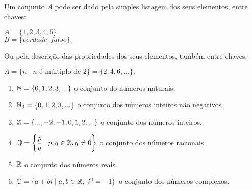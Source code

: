 \documentclass{beamer}
\begin{document}
    \begin{frame}
        Um conjunto $A$ pode ser dado pela simples listagem dos seus elementos, entre chaves:\pause
            \begin{center}
                $A = \{1,2,3,4,5\}$\pause\\
                $B = \{verdade, falso\}.$\pause
            \end{center}
            

        Ou pela descri{\c c}{\~a}o das propriedades dos seus elementos, tamb\'em  entre chaves:\pause
        \begin{center}
            $A = \{n \mid n \mbox{ \'e m{\'u}ltiplo de } 2\} = \{2,4,6,...\}.$
        \end{center}

        \begin{enumerate}[label={\arabic*})]
            \item $\mathbb{N} = \{0,1,2,3,...\}$ o conjunto do n{\'u}meros naturais.\pause
            \item $\mathbb{N}_0 = \{0,1,2,3,...\}$ o conjunto dos n{\'u}meros inteiros n{\~a}o negativos.\pause
            \item $\mathbb{Z} = \{...,-2,-1,0,1,2,...\}$ o conjunto dos n{\'u}meros inteiros.\pause
            \item $\mathbb{Q} = \left\{\dfrac{p}{q} \mid p,q \in \mathbb{Z}, q \neq 0 \right\}$ o conjunto dos n{\'u}meros racionais.\pause
            \item $\mathbb{R} $ o conjunto dos n{\'u}meros reais.\pause
            \item $\mathbb{C} = \{a + bi \mid a,b \in \mathbb{R},\ i^2 = -1\}$ o conjunto dos n\'umeros complexos.
        \end{enumerate}
    \end{frame}
\end{document}
